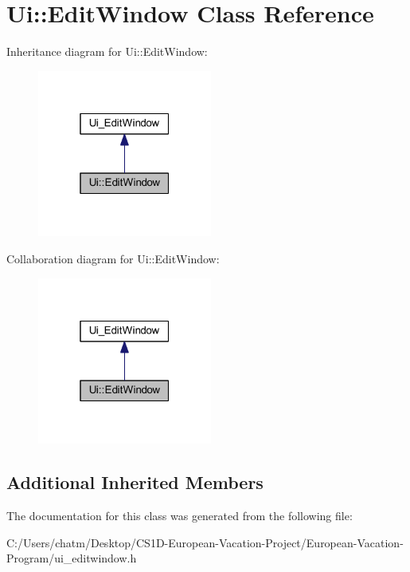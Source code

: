 \hypertarget{class_ui_1_1_edit_window}{}\section{Ui\+::Edit\+Window Class Reference}
\label{class_ui_1_1_edit_window}


Inheritance diagram for Ui\+::Edit\+Window\+:
\nopagebreak
\begin{figure}[H]
\begin{center}
\leavevmode
\includegraphics[width=163pt]{class_ui_1_1_edit_window__inherit__graph}
\end{center}
\end{figure}


Collaboration diagram for Ui\+::Edit\+Window\+:
\nopagebreak
\begin{figure}[H]
\begin{center}
\leavevmode
\includegraphics[width=163pt]{class_ui_1_1_edit_window__coll__graph}
\end{center}
\end{figure}
\subsection*{Additional Inherited Members}


The documentation for this class was generated from the following file\+:\begin{DoxyCompactItemize}
\item 
C\+:/\+Users/chatm/\+Desktop/\+C\+S1\+D-\/\+European-\/\+Vacation-\/\+Project/\+European-\/\+Vacation-\/\+Program/ui\+\_\+editwindow.\+h\end{DoxyCompactItemize}
